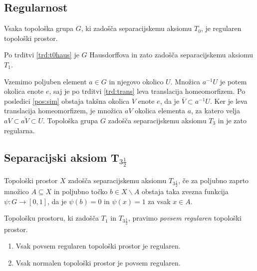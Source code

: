 \documentclass[mat1]{fmfdelo}
\newcommand{\closure}[1]{\overline{#1}}
\begin{document}
\subsection{Regularnost}

\begin{izrek}\label{izr:t3}
	Vsaka topološka grupa $G$, ki zadošča separacijskemu aksiomu $T_0$, je regularen topološki prostor.
\end{izrek}

\begin{dokaz}
	Po trditvi \ref{trd:t0haus} je $G$ Hausdorffova in zato zadošča separacijskemu aksiomu $T_1$.
	
	Vzemimo poljuben element $a \in G$ in njegovo okolico $U$. Množica $a^{-1}U$ je potem okolica enote $e$, saj je po trditvi \ref{trd:trans} leva translacija homeomorfizem. Po posledici \ref{pos:sim} obstaja takšna okolica $V$ enote $e$, da je $\closure{V} \subset a^{-1}U$. Ker je leva translacija homeomorfizem, je množica $aV$ okolica elementa $a$, za katero velja $aV \subset \closure{aV} \subset U$. Topološka grupa $G$ zadošča separacijskemu aksiomu $T_3$ in je zato regularna.
\end{dokaz}


\subsection{Separacijski aksiom T$_{3 \frac{1}{2}}$}

\begin{definicija}
	Topološki prostor $X$ zadošča separacijskemu aksiomu $T_{3 \frac{1}{2}}$, če za poljubno zaprto množico $A \subseteq X$ in poljubno točko $b \in X\backslash A$ obstaja taka zvezna funkcija $\psi\colon G \to [0, 1]$, da je $\psi (b) = 0$ in $\psi (x) = 1$ za vsak $x \in A$.
\end{definicija}

\begin{opomba}
	Topološku prostoru, ki zadošča $T_1$ in $T_{3 \frac{1}{2}}$, pravimo \emph{povsem regularen} topološki prostor.
\end{opomba}


\begin{trditev}\label{pos:reghaus}
\begin{enumerate}
\item Vsak povsem regularen topološki prostor je regularen.\label{podtrd:reghaus1}
\item Vsak normalen topološki prostor je povsem regularen.\label{podtrd:reghaus2}
\end{enumerate}
\end{trditev}
\end{document}
